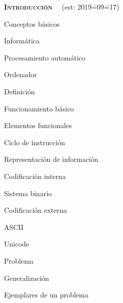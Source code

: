 \begin{longenum}
    \item \textbf{\textsc{Introducción}} \ \ (est: 2019\==09\==17)
    \begin{longenum}
        \item Conceptos básicos
        \begin{longenum}
            \item Informática
            \begin{longenum}
                \item Procesamiento automático
            \end{longenum}
            \item Ordenador
            \begin{longenum}
                \item Definición
                \item Funcionamiento básico
                \begin{longenum}
                    \item Elementos funcionales
                    \item Ciclo de instrucción
                    \item Representación de información
                    \begin{longenum}
                        \item Codificación interna
                        \begin{longenum}
                            \item Sistema binario
                        \end{longenum}
                        \item Codificación externa
                        \begin{longenum}
                            \item ASCII
                            \item Unicode
                        \end{longenum}
                    \end{longenum}
                \end{longenum}
            \end{longenum}
            \item Problema
            \begin{longenum}
                \item Generalización
                \item Ejemplares de un problema

\end{longenum}
\end{longenum}
\end{longenum}
\end{longenum}
